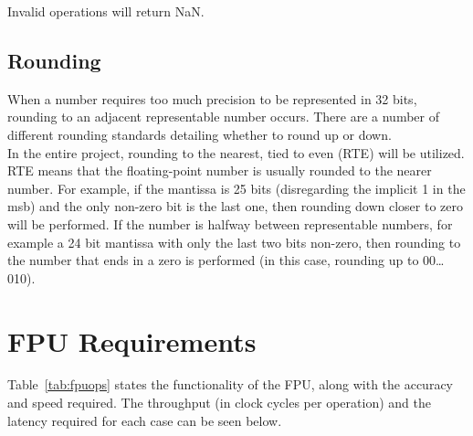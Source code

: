 \documentclass[11pt]{report}
\begin{document}
\noindent
Invalid operations will return NaN.

\subsection{Rounding}
\noindent
When a number requires too much precision to be represented in 32 bits, rounding to an adjacent representable number occurs. There are a number of different rounding standards detailing whether to round up or down.\\

\noindent
In the entire project, rounding to the nearest, tied to even (RTE) will be utilized. RTE means that the floating-point number is usually rounded to the nearer number. For example, if the mantissa is 25 bits (disregarding the implicit 1 in the msb) and the only non-zero bit is the last one, then rounding down closer to zero will be performed. If the number is halfway between representable numbers, for example a 24 bit mantissa with only the last two bits non-zero, then rounding to the number that ends in a zero is performed (in this case, rounding up to 00\dots010).

\clearpage
\section{FPU Requirements}\label{sec:requirements}
Table~\ref{tab:fpuops} states the functionality of the FPU, along with the accuracy and speed required. The throughput (in clock cycles per operation) and the latency required for each case can be seen below.
\end{document}

